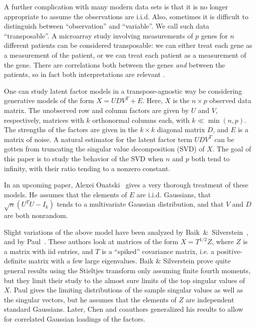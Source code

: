 A further complication with many modern data sets is that it is no longer
appropriate to assume the observations are i.i.d. Also, sometimes it is
difficult to distinguish between ``observation'' and ``variable''. We call such
data ``transposable''. A microarray study involving measurements of $p$ genes
for $n$ different patients can be considered transposable: we can either treat
each gene as a measurement of the patient, or we can treat each patient as a
measurement of the gene. There are correlations both between the genes
\emph{and} between the patients, so in fact both interpretations are relevant
\cite{efron2008smi}.

One can study latent factor models in a transpose-agnostic way be considering
generative models of the form $X = U D V^T + E$. Here, $X$ is the $n \times p$
observed data matrix. The unobserved row and column factors are given by $U$
and $V$, respectively, matrices with $k$ orthonormal columns each, with $k \ll
\min(n,p)$. The strengths of the factors are given in the $k\times k$ diagonal
matrix $D$, and $E$ is a matrix of noise. A natural estimator for the latent
factor term $U D V^T$ can be gotten from truncating the singular value
decomposition (SVD) \cite{golub1996mc} of $X$. The goal of this paper is to
study the behavior of the SVD when $n$ and $p$ both tend to infinity, with
their ratio tending to a nonzero constant.

In an upcoming paper, Alexei Onatski~\cite{onatski} gives a very thorough 
treatment of these models.  He assumes that the elements of $E$ are i.i.d.
Gaussians, that $\sqrt{n} ( U^T U - I_k) $ tends to a multivariate Gaussian
distribution, and that $V$ and $D$ are both nonrandom.

Slight variations of the above model have been analyzed by
Baik~\&~Silverstein~\cite{baik2006els}, and by Paul~\cite{paul2007ase}. These
authors look at matrices of the form $X = T^{1/2} Z$, where $Z$ is a matrix with
iid entries, and $T$ is a ``spiked'' covariance matrix, i.e. a positive-definite
matrix with a few large eigenvalues. Baik \& Silverstein prove quite general
results using the Stieltjes transform only assuming finite fourth moments, but
they limit their study to the almost sure limits of the top singular values of
$X$. Paul gives the limiting distributions of the sample singular values as well
as the singular vectors, but he assumes that the elements of $Z$ are independent
standard Gaussians. Later, Chen and coauthors \cite{chen2009ppc} generalized his
results to allow for correlated Gaussian loadings of the factors.

